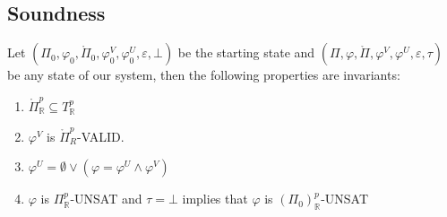 \subsection{Soundness}
\begin{theorem}
Let $(\Pi_0, \varphi_0, \mathring{\Pi}_0, \varphi^V_0, \varphi^U_0, \varepsilon, \bot)$ be the starting state and $(\Pi, \varphi, \mathring{\Pi}, \varphi^V, \varphi^U, \varepsilon, \tau)$ be any state of our system, then the following properties are invariants:
\begin{enumerate}
\item $\mathring{\Pi}^p_\mathbb{R} \subseteq T^p_\mathbb{R}$
\item $\varphi^V$ is $\mathring{\Pi}^p_{R}$-VALID.
\item $\varphi^U = \emptyset \vee (\varphi = \varphi^U \wedge \varphi^V)$
\item $\varphi$ is $\Pi^p_\mathbb{R}$-UNSAT and $\tau = \bot$ implies that $\varphi$ is $(\Pi_0)^p_\mathbb{R}$-UNSAT
\end{enumerate}
\end{theorem}


